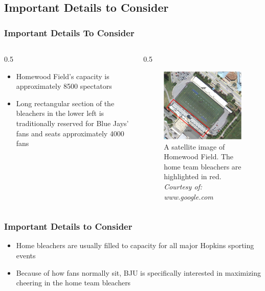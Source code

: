 \documentclass[compress,handout,10pt]{beamer}
\let\olditem\item
\renewcommand{\item}{\setlength{\itemsep}{0.5\baselineskip}\olditem}
\begin{document}
\subsection{Important Details to Consider}

\begin{frame}
	\frametitle {Important Details To Consider}
	\begin {columns}
		\begin {column}{0.5\textwidth}
		\begin{itemize}
			\item Homewood Field's capacity is approximately 8500 spectators \cite{wiki}
			\item Long rectangular section of the bleachers in the lower left is traditionally reserved for Blue Jays' fans and seats approximately 4000 fans
		\end {itemize}
	\end {column}
	\begin {column}{0.5\textwidth}
	\begin {figure}
	\begin{center}
		\includegraphics [width=2in] {Bleachers.png}
		\caption {{\tiny A satellite image of Homewood Field. The home team bleachers are highlighted in red. \textit{Courtesy of: www.google.com}}}
		\end{center}
	\end{figure}
\end {column}
\end {columns}
\end{frame}


\begin{frame}
	\frametitle{Important Details to Consider}
	\begin{itemize}
		\item Home bleachers are usually filled to capacity for all major Hopkins sporting events
		\item Because of how fans normally sit, BJU is specifically interested in maximizing cheering in the home team bleachers
	\end{itemize}
\end{frame}
\end{document}
